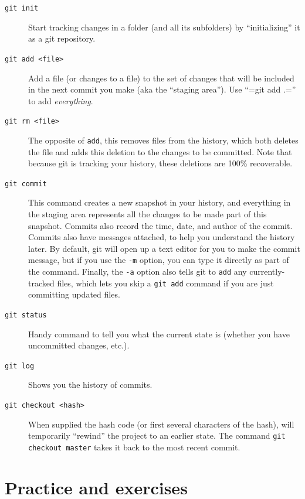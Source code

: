 \documentclass[11pt]{article}
\begin{document}
\begin{description}
\item[\texttt{git init}] Start tracking changes in a folder (and all its subfolders) by ``initializing'' it as a git repository.
\item[\texttt{git add <file>}] Add a file (or changes to a file) to the set of changes that will be included in the next commit you make (aka the ``staging area'').  Use ``=git add .='' to add \emph{everything}.
\item[\texttt{git rm <file>}] The opposite of \texttt{add}, this removes files from the history, which both deletes the file and adds this deletion to the changes to be committed. Note that because git is tracking your history, these deletions are 100\% recoverable.
\item[\texttt{git commit}] This command creates a new snapshot in your history, and everything in the staging area represents all the changes to be made part of this snapshot.  Commits also record the time, date, and author of the commit. Commits also have messages attached, to help you understand the history later. By default, git will open up a text editor for you to make the commit message, but if you use the \texttt{-m} option, you can type it directly as part of the command. Finally, the \texttt{-a} option also tells git to \texttt{add} any currently-tracked files, which lets you skip a \texttt{git add} command if you are just committing updated files.
\item[\texttt{git status}] Handy command to tell you what the current state is (whether you have uncommitted changes, etc.).
\item[\texttt{git log}] Shows you the history of commits.
\item[\texttt{git checkout <hash>}] When supplied the hash code (or first several characters of the hash), will temporarily ``rewind'' the project to an earlier state. The command \texttt{git checkout master} takes it back to the most recent commit.
\end{description}
\section{Practice and exercises}
\label{sec-12}
\end{document}
